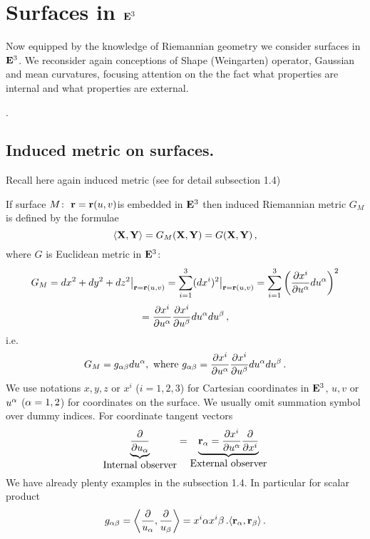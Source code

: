 \documentclass[12pt]{article}
\theoremstyle{theorem}
\numberwithin{equation}{section}
\begin{document}


\tableofcontents







\section {Surfaces in ${\bf E}^3$}

 Now equipped by the knowledge of Riemannian geometry we consider surfaces in ${\bf E}^3$. We
  reconsider again conceptions of Shape (Weingarten) operator, Gaussian and mean curvatures,
  focusing attention on the the fact what properties are internal and what properties are external.


.
 \subsection{ Induced metric on surfaces.}

   Recall here again induced metric (see for detail subsection 1.4)

  If surface $M\colon\,\, {\bf r}={\bf r}(u,v)$is embedded in ${\bf E}^3$ then induced Riemannian metric
  $G_M$ is defined by the formulae
  \begin{equation}\label{scalarproduct2}
    \langle{\bf X},{\bf Y}\rangle=G_M({\bf X},{\bf Y})=G({\bf X},{\bf Y})\,,
  \end{equation}
  where $G$ is Euclidean metric in ${\bf E}^3$:
           $$
        G_M=dx^2+dy^2+dz^2\big\vert_{{\bf r}={\bf r}(u,v)}=
        \sum_{i=1}^3(dx^i)^2\big\vert_{{\bf r}={\bf r}(u,v)}=\sum_{i=1}^3\left({\partial x^i\over \partial u^\alpha}du^\alpha\right)^2
                $$
                $$=
        {\partial x^i\over \partial u^\alpha} {\partial x^i\over\partial  u^\beta}du^\alpha du^\beta\,,
           $$
        i.e.
            $$
      G_M=g_{\alpha\beta}du^\alpha ,\,\, {\rm where}\,\, g_{\alpha\beta}=
      {\partial x^i\over \partial u^\alpha} {\partial x^i\over \partial u^\beta}du^\alpha du^\beta\,.
           $$
 We use notations $x,y,z$ or $x^i$ ($i=1,2,3$) for Cartesian coordinates in ${\bf E}^3$,
 $u,v$ or $u^\alpha$ ($\alpha=1,2$) for coordinates on the surface. We usually   omit summation symbol
 over  dummy indices.    For coordinate tangent vectors
           $$
 \underbrace{\partial\over \partial u_\alpha}_{\hbox{Internal observer}} =
 \underbrace{{\bf r}_\alpha={\partial x^i\over \partial u^\alpha}{\partial\over \partial x^i}}_{\hbox{External observer}}
           $$
We have already plenty examples in the subsection 1.4. In particular for scalar product
\begin{equation}\label{scalarproduct4}
  g_{\alpha\beta}=\left\langle{\partial\over u_\alpha},{\partial\over u_\beta}\right\rangle=x^i\alpha x^i\beta\,.
  \langle {\bf r}_\alpha,{\bf r}_\beta\rangle\,.
\end{equation}
\end{document}

